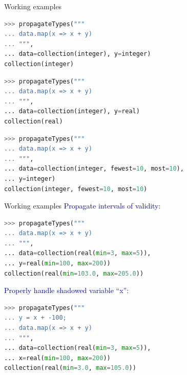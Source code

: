 \documentclass{beamer}
\begin{document}
\begin{frame}[fragile]{Working examples}
\vspace{0.3 cm}
\begin{lstlisting}[language=python]
>>> propagateTypes("""
... data.map(x => x + y)
... """,
... data=collection(integer), y=integer)
collection(integer)
\end{lstlisting}

\begin{lstlisting}[language=python]
>>> propagateTypes("""
... data.map(x => x + y)
... """,
... data=collection(integer), y=real)
collection(real)
\end{lstlisting}

\begin{lstlisting}[language=python]
>>> propagateTypes("""
... data.map(x => x + y)
... """,
... data=collection(integer, fewest=10, most=10),
... y=integer)
collection(integer, fewest=10, most=10)
\end{lstlisting}
\end{frame}

\begin{frame}[fragile]{Working examples}
\vspace{0.3 cm}
\textcolor{darkblue}{Propagate intervals of validity:}
\begin{lstlisting}[language=python]
>>> propagateTypes("""
... data.map(x => x + y)
... """,
... data=collection(real(min=3, max=5)),
... y=real(min=100, max=200))
collection(real(min=103.0, max=205.0))
\end{lstlisting}

\vfill
\textcolor{darkblue}{Properly handle shadowed variable ``x'':}
\begin{lstlisting}[language=python]
>>> propagateTypes("""
... y = x + -100;
... data.map(x => x + y)
... """,
... data=collection(real(min=3, max=5)),
... x=real(min=100, max=200))
collection(real(min=3.0, max=105.0))
\end{lstlisting}
\end{frame}
\end{document}
